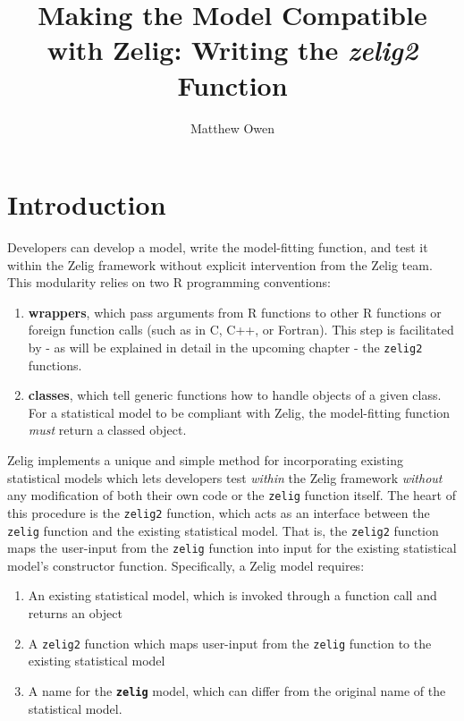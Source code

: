 \documentclass[11pt]{article}
\begin{document}
\title{Making the Model Compatible with Zelig: Writing the \emph{zelig2} Function}
\author{Matthew Owen}
\maketitle


\section{Introduction}
Developers can develop a model, write the model-fitting function, and test it within the Zelig framework without explicit intervention from the Zelig team.  This modularity relies on two R programming conventions:

\begin{enumerate}
	\item{{\bf wrappers}, which pass arguments from R functions to other R functions or foreign function calls (such as in C, C++, or Fortran).  This step is facilitated by - as will be explained in detail in the upcoming chapter - the {\tt zelig2} functions.}
	\item{{\bf classes}, which tell generic functions how to handle objects of a given class.  For a statistical model to be compliant with Zelig, the model-fitting function \emph{must} return a classed object.}
\end{enumerate}

Zelig implements a unique and simple method for incorporating existing statistical models which lets developers test \emph{within} the Zelig framework \emph{without} any modification of both their own code or the {\tt zelig} function itself.  The heart of this procedure is the {\tt zelig2} function, which acts as an interface between the {\tt zelig} function and the existing statistical model.  That is, the {\tt zelig2} function maps the user-input from the {\tt zelig} function into input for the existing statistical model's constructor function.  Specifically, a Zelig model requires:

\begin{enumerate}
	\item{An existing statistical model, which is invoked through a function call and returns an object}
	\item{A {\tt zelig2} function which maps user-input from the {\tt zelig} function to the existing statistical model}
	\item{A name for the {\tt \bf zelig} model, which can differ from the original name of the statistical model.}
\end{enumerate}
\end{document}
